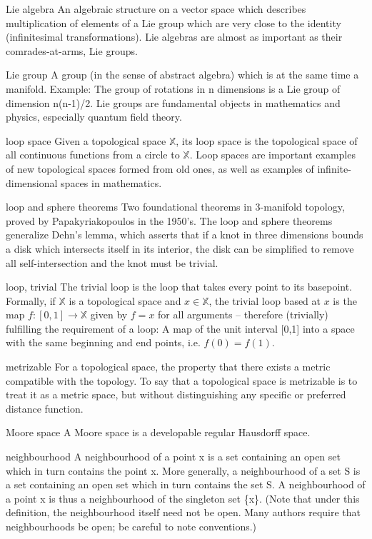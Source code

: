 \begin{description}
\begin{tiny}
\item[Lie algebra] An algebraic structure on a vector space which describes multiplication of elements of a Lie group which are very close to the identity (infinitesimal transformations). Lie algebras are almost as important as their comrades-at-arms, Lie groups.
\item[Lie group] A group (in the sense of abstract algebra) which is at the same time a manifold. Example: The group of rotations in n dimensions is a Lie group of dimension n(n-1)/2. Lie groups are fundamental objects in mathematics and physics, especially quantum field theory.
\item[loop space] Given a topological space $\mathbb{X}$, its loop space is the topological space of all continuous functions from a circle to $\mathbb{X}$. Loop spaces are important examples of new topological spaces formed from old ones, as well as examples of infinite-dimensional spaces in mathematics.
\item[loop and sphere theorems] Two foundational theorems in 3-manifold topology, proved by Papakyriakopoulos in the 1950's. The loop and sphere theorems generalize Dehn's lemma, which asserts that if a knot in three dimensions bounds a disk which intersects itself in its interior, the disk can be simplified to remove all self-intersection and the knot must be trivial.
\item[loop, trivial] The trivial loop is the loop that takes every point to its basepoint. Formally, if $\mathbb{X}$ is a topological space and $x \in \mathbb{X}$, the trivial loop based at $x$ is the map $f : [0,1] \rightarrow \mathbb{X}$ given by $f=x$ for all arguments -- therefore (trivially) fulfilling the requirement of a loop: A map of the unit interval [0,1] into a space with the same beginning and end points, i.e. $f(0)=f(1)$.
\item[metrizable] For a topological space, the property that there exists a metric compatible with the topology. To say that a topological space is metrizable is to treat it as a metric space, but without distinguishing any specific or preferred distance function.
\item[Moore space] A Moore space is a developable regular Hausdorff space.
\item[neighbourhood] A neighbourhood of a point x is a set containing an open set which in turn contains the point x. More generally, a neighbourhood of a set S is a set containing an open set which in turn contains the set S. A neighbourhood of a point x is thus a neighbourhood of the singleton set \{x\}. (Note that under this definition, the neighbourhood itself need not be open. Many authors require that neighbourhoods be open; be careful to note conventions.)

\end{tiny}
\end{description}
